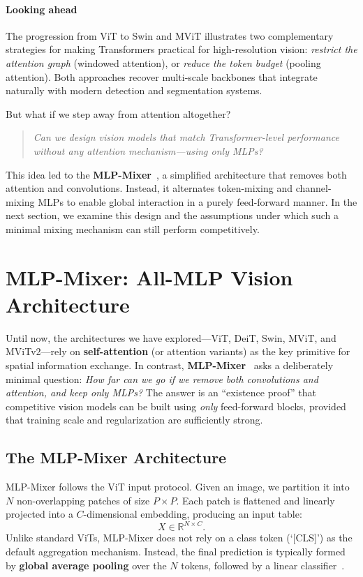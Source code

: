 \paragraph{Looking ahead}
\noindent
The progression from ViT to Swin and MViT illustrates two complementary strategies for making Transformers practical for high-resolution vision:
\emph{restrict the attention graph} (windowed attention), or \emph{reduce the token budget} (pooling attention).
Both approaches recover multi-scale backbones that integrate naturally with modern detection and segmentation systems.

\noindent
But what if we step away from attention altogether?

\begin{quote}
	\emph{Can we design vision models that match Transformer-level performance without any attention mechanism---using only MLPs?}
\end{quote}

\noindent
This idea led to the \textbf{MLP-Mixer}~\cite{tolstikhin2021_mlpmixer}, a simplified architecture that removes both attention and convolutions.
Instead, it alternates token-mixing and channel-mixing MLPs to enable global interaction in a purely feed-forward manner.
In the next section, we examine this design and the assumptions under which such a minimal mixing mechanism can still perform competitively.

\newpage

\section{MLP-Mixer: All-MLP Vision Architecture}
\label{sec:chapter18_mlpmixer}

\noindent
Until now, the architectures we have explored—ViT, DeiT, Swin, MViT, and MViTv2—rely on \textbf{self-attention} (or attention variants) as the key primitive for spatial information exchange.
In contrast, \textbf{MLP-Mixer}~\cite{tolstikhin2021_mlpmixer} asks a deliberately minimal question:
\emph{How far can we go if we remove both convolutions and attention, and keep only MLPs?}
The answer is an ``existence proof'' that competitive vision models can be built using \emph{only} feed-forward blocks, provided that training scale and regularization are sufficiently strong.

\subsection{The MLP-Mixer Architecture}
\noindent
MLP-Mixer follows the ViT input protocol.
Given an image, we partition it into $N$ non-overlapping patches of size $P \times P$.
Each patch is flattened and linearly projected into a $C$-dimensional embedding, producing an input table:
\[
X \in \mathbb{R}^{N \times C}.
\]
Unlike standard ViTs, MLP-Mixer does not rely on a class token (`[CLS]') as the default aggregation mechanism.
Instead, the final prediction is typically formed by \textbf{global average pooling} over the $N$ tokens, followed by a linear classifier~\cite{tolstikhin2021_mlpmixer}.

